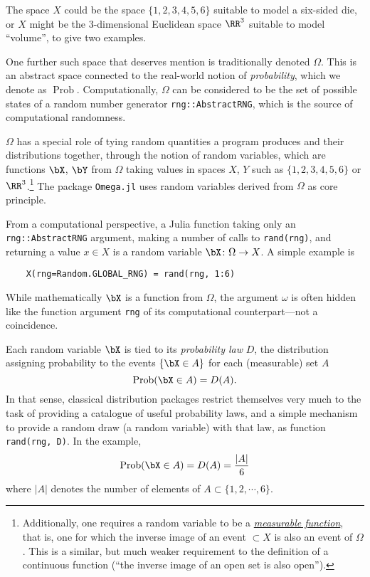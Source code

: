 \documentclass{juliacon}
\begin{document}
The space $X$ could be the space $\{1,2,3,4,5,6\}$ suitable to model a six-sided die, or $X$ might be the 3-dimensional Euclidean space $\RR^3$ suitable to model ``volume'', to give two examples.

One further such space that deserves mention is traditionally denoted $\Omega$. This is an abstract space connected to the real-world notion of \emph{probability}, which we denote as $\operatorname{Prob}$.
Computationally, $\Omega$ can be considered to be the set of possible states of a random number generator \verb|rng::AbstractRNG|, which is the source of computational randomness.

$\Omega$ has a special role of tying random quantities a program produces and their
distributions together, through the notion of random variables, which are
functions $\bX$, $\bY$ from $\Omega$ taking values in spaces $X$, $Y$ such as
$\{1,2,3,4,5,6\}$ or $\RR^3$.\footnote{Additionally, one requires a random
variable to be a \href{https://en.wikipedia.org/wiki/Measurable_function}{\emph{measurable
function}}, that is, one for which the inverse image of an event $\subset X$ is
also an event of $\Omega$.
This is a similar, but much weaker requirement to the definition of a continuous function (``the inverse image of an open set is also open'').}
The package \verb|Omega.jl| \cite{tavares2019language} uses random variables
derived from $\Omega$ as  core principle. 

From a computational perspective,
a Julia function taking only an \verb|rng::AbstractRNG| argument, making a number of calls to \verb|rand(rng)|, and returning a value $x\in X$ is a random variable $\bX \colon \Omega\to X$.
A simple example is  
\begin{verbatim}
    X(rng=Random.GLOBAL_RNG) = rand(rng, 1:6)
\end{verbatim}
While mathematically $\bX$ is a function from $\Omega$, the argument $\omega$ is often hidden like the function argument \verb|rng| of its computational counterpart---not a coincidence.


Each random variable $\bX$ is tied to its \emph{probability law} $D$, the distribution assigning probability to the events $\{\bX \in A\}$ for each (measurable) set $A$
\[\operatorname{Prob}(\bX \in A) = D(A).
\]
In that sense, classical distribution packages restrict themselves very much to the task of providing a catalogue of useful probability laws, and a simple mechanism to provide a random draw (a random variable) with that law, as function
\verb|rand(rng, D)|.
In the example, 
\[\operatorname{Prob}(\bX \in A) = D(A) =  \dfrac{|A|}{6}\]
where $|A|$ denotes the number of elements of $A \subset \{1,2,\cdots,6\}$.
\end{document}
